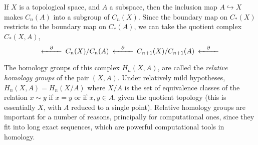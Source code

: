 \documentclass[12pt]{article}
\begin{document}
If $X$ is a topological space, and $A$ a subspace, then the inclusion map $A\hookrightarrow X$
makes $C_n(A)$ into a subgroup of $C_n(X)$.  Since the boundary map on $C_*(X)$ restricts to
the boundary map on $C_*(A)$, we can take the quotient complex $C_*(X,A)$,
$$\begin{CD}
@<\partial<< C_n(X)/C_n(A) @<\partial<< C_{n+1}(X)/C_{n+1}(A) @<\partial<<
\end{CD}$$

The homology groups of this complex $H_n(X,A)$, are called the {\em relative homology groups}
of the pair $(X,A)$.  Under relatively mild hypotheses, $H_n(X,A)=H_n(X/A)$ where $X/A$ is
the set of equivalence classes of the relation $x\sim y$ if $x=y$ or if $x,y\in A$, given the quotient
topology (this is essentially $X$, with $A$ reduced to a single point). Relative homology groups are 
important for a number of reasons, principally for computational ones, since they fit into long 
exact sequences, which are powerful computational tools in homology.
\end{document}
